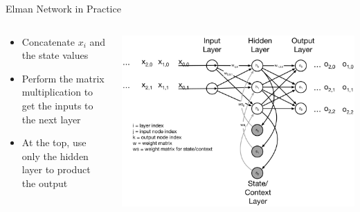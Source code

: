 \documentclass[aspectratio=169]{beamer}
\begin{document}
\begin{frame}[fragile]{Elman Network in Practice}

\begin{columns}
\begin{column}{0.6\textwidth}
\begin{itemize}
	\item Concatenate $x_i$ and the state values
	\item Perform the matrix multiplication to get the inputs to the next layer
	\item At the top, use only the hidden layer to product the output
\end{itemize}
\end{column}
\begin{column}{0.4\textwidth}
\includegraphics[width=1\textwidth]{lectRNN/Elman.pdf}
\end{column}
\end{columns}
\end{frame}
\end{document}
